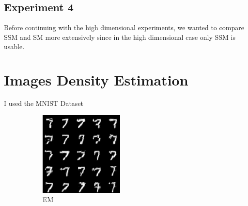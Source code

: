 \subsection{Experiment 4}

Before continuing with the high dimensional experiments, we wanted to compare SSM and SM more extensively since in the high dimensional case
only SSM is usable. 

\newpage
\section{Images Density Estimation}

I used the MNIST Dataset \cite{mnist} 

\begin{figure}[H]
    \centering
    \begin{subfigure}[b]{0.3\textwidth}
        \centering
        \includegraphics[width=\textwidth]{figures/mnist_EM.png} %
        \caption{EM}
        \label{fig:sub1}
    \end{subfigure}
    \hfill
    \begin{subfigure}[b]{0.3\textwidth}
        \centering

\end{subfigure}
\end{figure}
